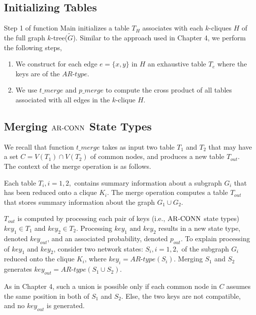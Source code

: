 \subsection{Initializing Tables}
\label{subsec:initt}
Step 1 of function Main initializes a table $T_H$ associates with each $k$-cliques $H$ of the full graph $k$-tree($\tilde{G}$).
Similar to the approach used in Chapter 4, we perform the following steps,
\begin{enumerate}[noitemsep]

\item We construct for each edge $e=\{x,y\}$ in $H$ an exhaustive table $T_e$ where the keys are of the $AR$-$type$.
\item We use $t\_merge$ and $p\_merge$ to compute the cross product of all tables associated with all edges in the $k$-clique $H$.
\end{enumerate}

\subsection{Merging ${\mathrm {AR\mbox{-}CONN}}$ State Types}
\label{subsec:mst}

We recall that function $t\_merge$ takes as input two table $T_1$ and $T_2$ that may have a set $C=V(T_1)\cap V(T_2)$ of common nodes, and produces a new table $T_{out}$. The context of the merge operation is as follows. 


Each table $T_i, i=1,2,$ contains summary information about a subgraph $G_i$ that has been reduced onto a clique $K_i$. The merge operation computes a table $T_{out}$  that stores summary information about the graph $G_1\cup G_2$.

$T_{out}$ is computed by processing each pair of keys (i.e., ${\mathrm {AR\mbox{-}CONN}}$ state types) $key_1\in T_1$ and $key_2\in T_2$. Processing $key_1 \mbox{ and } key_2$ results in a new state type, denoted $key_{out}$, and an associated probability, denoted $p_{out}$.
%
To explain processing of $key_1$ and $key_2$, consider two network states: $S_i, i=1,2,$ of the subgraph $G_i$ reduced onto the clique $K_i$, where $key_i=AR\mbox{-}type(S_i)$. Merging $S_1$ and $S_2$ generates $key_{out}=AR\mbox{-}type(S_1\cup S_2)$.

As in Chapter 4, such a union is possible only if each common node in $C$ assumes the same position in both of $S_1$ and $S_2$. Else, the two keys are not compatible, and no $key_{out}$ is generated.

